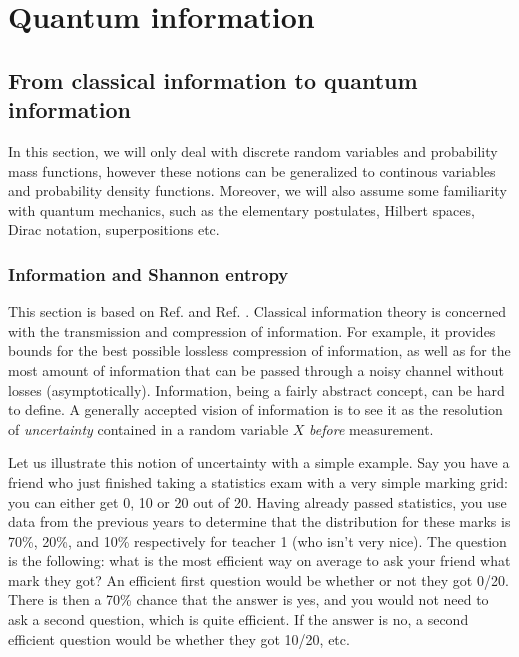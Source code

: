 \chapter{Quantum information} \label{chap:quantum_information}

\section{From classical information to quantum information} \label{sec:classical_information}

In this section, we will only deal with discrete random variables and probability mass functions, however these notions can be generalized to continous variables and probability density functions. Moreover, we will also assume some familiarity with quantum mechanics, such as the elementary postulates, Hilbert spaces, Dirac notation, superpositions etc.



\subsection{Information and Shannon entropy}

This section is based on Ref. \cite[pp. 1-56]{cover_elements_2006} and Ref. \cite[pp. 500-506]{nielsen_quantum_2010}. Classical information theory is concerned with the transmission and compression of information. For example, it provides bounds for the best possible lossless compression of information, as well as for the most amount of information that can be passed through a noisy channel without losses (asymptotically). Information, being a fairly abstract concept, can be hard to define. A generally accepted vision of information is to see it as the resolution of \textit{uncertainty} contained in a random variable $X$ \textit{before} measurement.

Let us illustrate this notion of uncertainty with a simple example. Say you have a friend who just finished taking a statistics exam with a very simple marking grid: you can either get 0, 10 or 20 out of 20. Having already passed statistics, you use data from the previous years to determine that the distribution for these marks is 70\%, 20\%, and 10\% respectively for teacher 1 (who isn't very nice). The question is the following: what is the most efficient way on average to ask your friend what mark they got? An efficient first question would be whether or not they got 0/20. There is then a 70\% chance that the answer is yes, and you would not need to ask a second question, which is quite efficient. If the answer is no, a second efficient question would be whether they got 10/20, etc.

